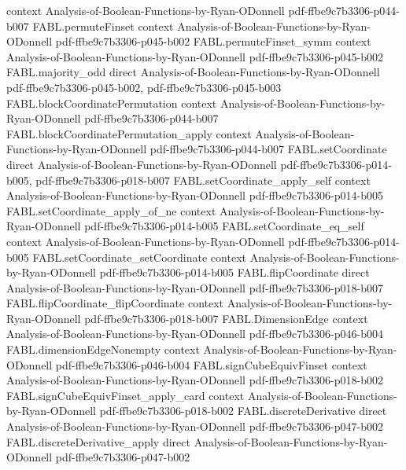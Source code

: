 \begin{theorem}
  {context}
  {Analysis-of-Boolean-Functions-by-Ryan-ODonnell}
  {pdf-ffbe9c7b3306-p044-b007}
\proofstep
  {FABL.permuteFinset}
  {context}
  {Analysis-of-Boolean-Functions-by-Ryan-ODonnell}
  {pdf-ffbe9c7b3306-p045-b002}
\proofstep
  {FABL.permuteFinset_symm}
  {context}
  {Analysis-of-Boolean-Functions-by-Ryan-ODonnell}
  {pdf-ffbe9c7b3306-p045-b002}
\proofstep
  {FABL.majority_odd}
  {direct}
  {Analysis-of-Boolean-Functions-by-Ryan-ODonnell}
  {pdf-ffbe9c7b3306-p045-b002,
    pdf-ffbe9c7b3306-p045-b003}
\proofstep
  {FABL.blockCoordinatePermutation}
  {context}
  {Analysis-of-Boolean-Functions-by-Ryan-ODonnell}
  {pdf-ffbe9c7b3306-p044-b007}
\proofstep
  {FABL.blockCoordinatePermutation_apply}
  {context}
  {Analysis-of-Boolean-Functions-by-Ryan-ODonnell}
  {pdf-ffbe9c7b3306-p044-b007}
\proofstep
  {FABL.setCoordinate}
  {direct}
  {Analysis-of-Boolean-Functions-by-Ryan-ODonnell}
  {pdf-ffbe9c7b3306-p014-b005,
    pdf-ffbe9c7b3306-p018-b007}
\proofstep
  {FABL.setCoordinate_apply_self}
  {context}
  {Analysis-of-Boolean-Functions-by-Ryan-ODonnell}
  {pdf-ffbe9c7b3306-p014-b005}
\proofstep
  {FABL.setCoordinate_apply_of_ne}
  {context}
  {Analysis-of-Boolean-Functions-by-Ryan-ODonnell}
  {pdf-ffbe9c7b3306-p014-b005}
\proofstep
  {FABL.setCoordinate_eq_self}
  {context}
  {Analysis-of-Boolean-Functions-by-Ryan-ODonnell}
  {pdf-ffbe9c7b3306-p014-b005}
\proofstep
  {FABL.setCoordinate_setCoordinate}
  {context}
  {Analysis-of-Boolean-Functions-by-Ryan-ODonnell}
  {pdf-ffbe9c7b3306-p014-b005}
\proofstep
  {FABL.flipCoordinate}
  {direct}
  {Analysis-of-Boolean-Functions-by-Ryan-ODonnell}
  {pdf-ffbe9c7b3306-p018-b007}
\proofstep
  {FABL.flipCoordinate_flipCoordinate}
  {context}
  {Analysis-of-Boolean-Functions-by-Ryan-ODonnell}
  {pdf-ffbe9c7b3306-p018-b007}
\proofstep
  {FABL.DimensionEdge}
  {context}
  {Analysis-of-Boolean-Functions-by-Ryan-ODonnell}
  {pdf-ffbe9c7b3306-p046-b004}
\proofstep
  {FABL.dimensionEdgeNonempty}
  {context}
  {Analysis-of-Boolean-Functions-by-Ryan-ODonnell}
  {pdf-ffbe9c7b3306-p046-b004}
\proofstep
  {FABL.signCubeEquivFinset}
  {context}
  {Analysis-of-Boolean-Functions-by-Ryan-ODonnell}
  {pdf-ffbe9c7b3306-p018-b002}
\proofstep
  {FABL.signCubeEquivFinset_apply_card}
  {context}
  {Analysis-of-Boolean-Functions-by-Ryan-ODonnell}
  {pdf-ffbe9c7b3306-p018-b002}
\proofstep
  {FABL.discreteDerivative}
  {direct}
  {Analysis-of-Boolean-Functions-by-Ryan-ODonnell}
  {pdf-ffbe9c7b3306-p047-b002}
\proofstep
  {FABL.discreteDerivative_apply}
  {direct}
  {Analysis-of-Boolean-Functions-by-Ryan-ODonnell}
  {pdf-ffbe9c7b3306-p047-b002}

\end{theorem}
